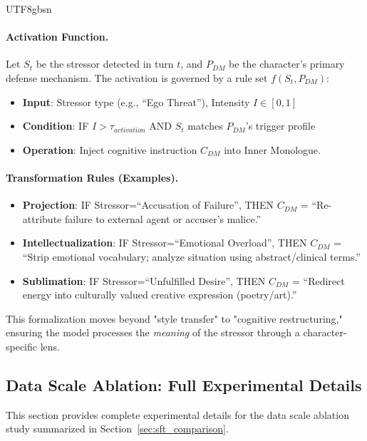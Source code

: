 \documentclass[11pt]{article}
\begin{document}
\begin{CJK*}{UTF8}{gbsn}
\paragraph{Activation Function.} Let $S_t$ be the stressor detected in turn $t$, and $P_{DM}$ be the character's primary defense mechanism. The activation is governed by a rule set $f(S_t, P_{DM})$:
\begin{itemize}
    \item \textbf{Input}: Stressor type (e.g., ``Ego Threat''), Intensity $I \in [0,1]$
    \item \textbf{Condition}: IF $I > \tau_{activation}$ AND $S_t$ matches $P_{DM}$'s trigger profile
    \item \textbf{Operation}: Inject cognitive instruction $C_{DM}$ into Inner Monologue.
\end{itemize}

\paragraph{Transformation Rules (Examples).}
\begin{itemize}
    \item \textbf{Projection}: IF Stressor=``Accusation of Failure'', THEN $C_{DM}$ = ``Re-attribute failure to external agent or accuser's malice.''
    \item \textbf{Intellectualization}: IF Stressor=``Emotional Overload'', THEN $C_{DM}$ = ``Strip emotional vocabulary; analyze situation using abstract/clinical terms.''
    \item \textbf{Sublimation}: IF Stressor=``Unfulfilled Desire'', THEN $C_{DM}$ = ``Redirect energy into culturally valued creative expression (poetry/art).''
\end{itemize}
This formalization moves beyond "style transfer" to "cognitive restructuring," ensuring the model processes the \textit{meaning} of the stressor through a character-specific lens.

\subsection{Data Scale Ablation: Full Experimental Details}
\label{sec:datasize_details}

This section provides complete experimental details for the data scale ablation study summarized in Section~\ref{sec:sft_comparison}.


\end{CJK*}
\end{document}
